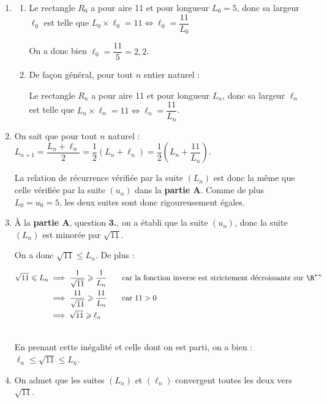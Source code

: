 \begin{enumerate}
\item 
	\begin{enumerate}
		\item Le rectangle $R_0$ a pour aire 11 et pour longueur $L_0 = 5$, donc sa largeur $\ell_{0}$ est telle que $L_0 \times \ell_0 = 11 \iff \ell_0 = \dfrac{11}{L_0}$

On a donc bien $\ell_{0}=\dfrac{11}{5} = 2,2$.

		\item De façon général, pour tout $n$ entier naturel :

		Le rectangle $R_n$ a pour aire 11 et pour longueur $L_n$, donc sa largeur $\ell_{n}$ est telle que $L_n \times \ell_n = 11 \iff \ell_n = \dfrac{11}{L_n}$.

	\end{enumerate}
\item On sait que pour tout $n$ naturel : $L_{n+1} = \dfrac{L_n + \ell_n}{2} = \dfrac{1}{2}\left(L_n + \ell_n\right)  = \dfrac{1}{2}\left(L_n + \dfrac{11}{L_n}\right)$.

La relation de récurrence vérifiée par la suite $(L_n)$ est donc la même que celle vérifiée par la suite $(u_n)$ dans la \textbf{partie A}. Comme de plus $L_0 = u_0 = 5$, les deux suites sont donc rigoureusement égales.
	\item À la \textbf{partie A}, question \textbf{3.}, on a établi que la suite $(u_n)$, donc la suite $(L_n)$ est minorée par $\sqrt{11}$.

On a donc $\sqrt{11}\leqslant L_n$. De plus :

$\begin{aligned}[t] \sqrt{11}\leqslant L_n &\implies \dfrac{1}{\sqrt{11}} \geqslant \dfrac{1}{L_n} \qquad\text{car la fonction inverse est strictement décroissante sur }\R^{*+}\\
&\implies \dfrac{11}{\sqrt{11}} \geqslant \dfrac{11}{L_n} \qquad \text{car } 11>0\\
&\implies \sqrt{11}\geqslant\ell_n\\
\\ \end{aligned}$

En prenant cette inégalité et celle dont on est parti, on a bien : $\ell_n \leqslant\sqrt{11} \leqslant L_n$.

\item On admet que les suites $\left(L_{n}\right)$ et $\left(\ell_{n}\right)$ convergent toutes les deux vers $\sqrt{11}$.


\end{enumerate}
